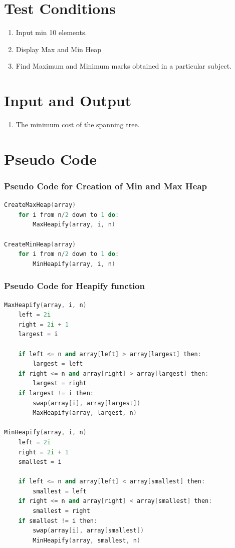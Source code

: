 \documentclass[11pt]{article}
\begin{document}
\section{Test Conditions}
\begin{enumerate}
    \item Input min 10 elements.
    \item Display Max and Min Heap
    \item Find Maximum and Minimum marks obtained in a particular subject.
\end{enumerate}

\section{Input and Output}
\begin{enumerate}
    \item The minimum cost of the spanning tree.
\end{enumerate}

\section{Pseudo Code}
\subsubsection*{Pseudo Code for Creation of Min and Max Heap}
\begin{lstlisting}[language=c++]
CreateMaxHeap(array)
    for i from n/2 down to 1 do:
        MaxHeapify(array, i, n)

CreateMinHeap(array)
    for i from n/2 down to 1 do:
        MinHeapify(array, i, n)

\end{lstlisting}
\subsubsection*{Pseudo Code for Heapify function}
\begin{lstlisting}[language=c++]
MaxHeapify(array, i, n)
    left = 2i
    right = 2i + 1
    largest = i
    
    if left <= n and array[left] > array[largest] then:
        largest = left
    if right <= n and array[right] > array[largest] then:
        largest = right
    if largest != i then:
        swap(array[i], array[largest])
        MaxHeapify(array, largest, n)

MinHeapify(array, i, n)
    left = 2i
    right = 2i + 1
    smallest = i
    
    if left <= n and array[left] < array[smallest] then:
        smallest = left
    if right <= n and array[right] < array[smallest] then:
        smallest = right
    if smallest != i then:
        swap(array[i], array[smallest])
        MinHeapify(array, smallest, n)

\end{lstlisting}
\end{document}
